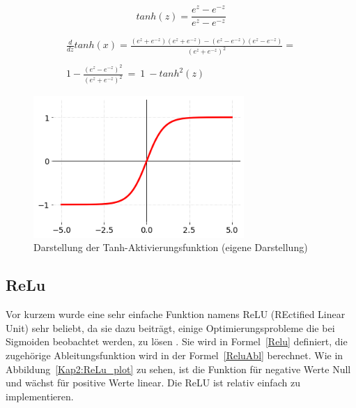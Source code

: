\begin{equation} \label{TanhF}
    tanh(z) = \frac{e^{z}-e^{-z}}{e^{z}-e^{-z}}
\end{equation}

\begin{equation} \label{TanhAbl}
    \begin{array}{ c }
        \frac{d}{dz} tanh( x) =\frac{\left( e^{z} +e^{-z}\right)\left( e^{z} +e^{-z}\right) -\left( e^{z} -e^{-z}\right)\left( e^{z} -e^{-z}\right)}{\left( e^{z} +e^{-z}\right)^{2}} = \\
        \\
        1-\frac{\left( e^{z} -e^{-z}\right)^{2}}{\left( e^{z} +e^{-z}\right)^{2}} \ =\ 1\ -tanh^{2}( z)
    \end{array}
\end{equation}

\begin{figure}[H]
    \centering
    \includegraphics[width=8cm]{kapitel2/tanh_plot.png}
    \caption[Darstellung der Tanh-Aktivierungsfunktion]{Darstellung der Tanh-Aktivierungsfunktion (eigene Darstellung)}
    \label{Kap2:Tanh_plot}
\end{figure}

\subsection{ReLu}
Vor kurzem wurde eine sehr einfache Funktion namens ReLU (REctified Linear Unit) sehr beliebt, da sie dazu beiträgt, einige Optimierungsprobleme die bei Sigmoiden beobachtet werden, zu lösen \cite*[11]{AntonioGuili;AmitaKapoor;SujitPal2019}. Sie wird in Formel~\ref{Relu} definiert, die zugehörige Ableitungsfunktion wird in der Formel~\ref{ReluAbl} berechnet. Wie in Abbildung~\ref{Kap2:ReLu_plot} zu sehen, ist die Funktion für negative Werte Null und wächst für positive Werte linear. Die ReLU ist relativ einfach zu implementieren.

